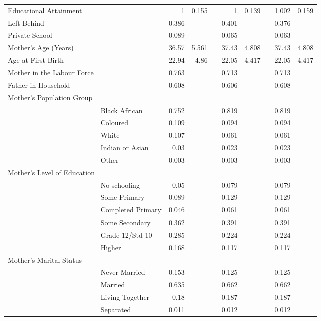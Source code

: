 \begin{table}[ht]
\begin{tabular}{llrrlrrlrr}
  Educational Attainment &  &     1 & 0.155 &  &     1 & 0.139 &  & 1.002 & 0.159 \\ 
  Left Behind &  & 0.386 &  &  & 0.401 &  &  & 0.376 &  \\ 
  Private School &  & 0.089 &  &  & 0.065 &  &  & 0.063 &  \\ 
  Mother's Age (Years) &  & 36.57 & 5.561 &  & 37.43 & 4.808 &  & 37.43 & 4.808 \\ 
  Age at First Birth &  & 22.94 &  4.86 &  & 22.05 & 4.417 &  & 22.05 & 4.417 \\ 
  Mother in the Labour Force &  & 0.763 &  &  & 0.713 &  &  & 0.713 &  \\ 
  Father in Household &  & 0.608 &  &  & 0.606 &  &  & 0.608 &  \\ 
   \multicolumn{2}{l}{Mother's Population Group} &  &  &  & & & & \\ & Black African & 0.752 &  &  & 0.819 &  &  & 0.819 &  \\ 
   & Coloured & 0.109 &  &  & 0.094 &  &  & 0.094 &  \\ 
   & White & 0.107 &  &  & 0.061 &  &  & 0.061 &  \\ 
   & Indian or Asian &  0.03 &  &  & 0.023 &  &  & 0.023 &  \\ 
   & Other & 0.003 &  &  & 0.003 &  &  & 0.003 &  \\ 
   \multicolumn{2}{l}{Mother's Level of Education} &  &  &  & & & & \\ & No schooling &  0.05 &  &  & 0.079 &  &  & 0.079 &  \\ 
   & Some Primary & 0.089 &  &  & 0.129 &  &  & 0.129 &  \\ 
   & Completed Primary & 0.046 &  &  & 0.061 &  &  & 0.061 &  \\ 
   & Some Secondary & 0.362 &  &  & 0.391 &  &  & 0.391 &  \\ 
   & Grade 12/Std 10 & 0.285 &  &  & 0.224 &  &  & 0.224 &  \\ 
   & Higher & 0.168 &  &  & 0.117 &  &  & 0.117 &  \\ 
   \multicolumn{2}{l}{Mother's Marital Status} &  &  &  & & & & \\ & Never Married & 0.153 &  &  & 0.125 &  &  & 0.125 &  \\ 
   & Married & 0.635 &  &  & 0.662 &  &  & 0.662 &  \\ 
   & Living Together &  0.18 &  &  & 0.187 &  &  & 0.187 &  \\ 
   & Separated & 0.011 &  &  & 0.012 &  &  & 0.012 &  \\ 

\end{tabular}
\end{table}
